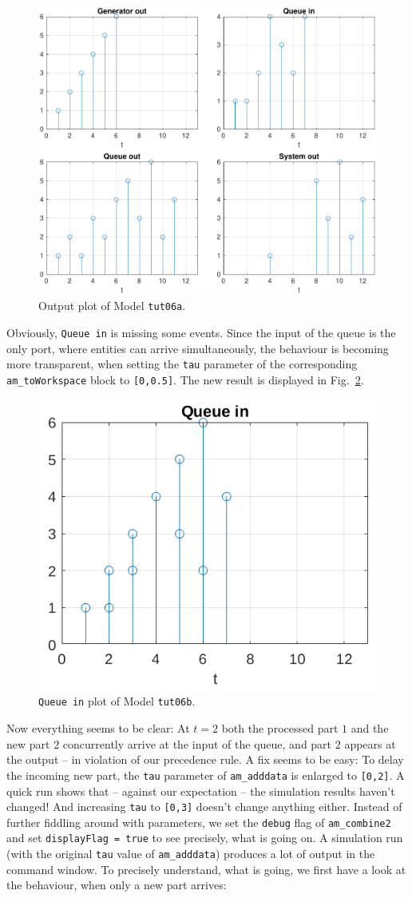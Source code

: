 \documentclass[12pt,oneside,a4paper,bibtotoc,BCOR=0pt,DIV=20]{scrreprt}
\newcommand{\cft}[1]{\mbox{\texttt{#1}}}   %
\begin{document}
\begin{figure}[ht]
\centering
\includegraphics[width=0.48\columnwidth]{images/bild16.pdf}
\caption{Output plot of Model \cft{tut06a}.}
\label{fig_16}
\end{figure}

Obviously, \cft{Queue in} is missing some events. Since the input of the
queue is the only port, where entities can arrive simultaneously, the behaviour
is becoming more transparent, when setting the \cft{tau} parameter of the
corresponding \cft{am\_toWorkspace} block to \cft{[0,0.5]}. The new result is
displayed in Fig.\ \ref{fig_17}.

\begin{figure}[ht]
\centering
\includegraphics[width=0.24\columnwidth]{images/bild17.pdf}
\caption{ \cft{Queue in} plot of Model \cft{tut06b}.}
\label{fig_17}
\end{figure}

Now everything seems to be clear: At $t = 2$ both the processed part $1$ and
the new part $2$ concurrently arrive at the input of the queue, and part $2$
appears at the output -- in violation of our precedence rule. A fix seems to be
easy: To delay the incoming new part, the \cft{tau} parameter of
\cft{am\_adddata} is enlarged to \cft{[0,2]}. A quick run shows that -- against
our expectation -- the simulation results haven't changed! And increasing
\cft{tau} to \cft{[0,3]} doesn't change anything either. Instead of further
fiddling around with parameters, we set the \cft{debug} flag of
\cft{am\_combine2} and set \cft{displayFlag = true} to see precisely, what is
going on. A simulation run (with the original \cft{tau} value of
\cft{am\_adddata}) produces a lot of output in the command window. To precisely
understand, what is going, we first have a look at the behaviour, when only a
new part arrives:
\end{document}
